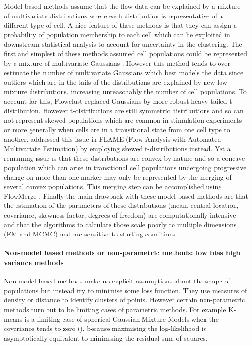 Model based methods assume that the flow data can be explained by a mixture of multivariate distributions where each distribution is representative of a different type of cell.
A nice feature of these methods is that they can assign a probability of population membership to each cell which can be exploited in downstream statistical analysis to account for uncertainty in the clustering.
The first and simplest of these methods assumed cell populations could be represented by a mixture of multivariate Gaussians \citep{Chan:2008gq}.
However this method tends to over estimate the number of multivariate Gaussians which best models the data since outliers which are in the tails of the distributions
are explained by new low mixture distributions, increasing unreasonably the number of cell populations.
To account for this, Flowclust \citep{Lo:2008it} replaced Gaussians by more robust heavy tailed t-distribution.
However t-distributions are still symmetric distributions and so can not represent skewed populations which are common in stimulation experiments or more generally when cells are in a transitional state from one cell type to another.
\citet{Pyne:2009hl} addressed this issue in FLAME (Flow Analysis with Automated Multivariate Estimation) by employing skewed t-distributions instead.
Yet a remaining issue is that these distributions are convex by nature and so a concave population which can arise in transitional cell populations undergoing progressive change on more than one marker may only be represented by the merging of several convex populations.
This merging step can be accomplished using FlowMerge \citep{Finak:2009fk}.
Finally the main drawback with these model-based methods are that the estimation of the parameters of these distributions (mean, central location, covariance, skewness factor, degrees of freedom) are computationally intensive and that the algorithms to calculate those scale poorly to multiple dimensions (EM \citep{Dempster:1977ul} and MCMC) and are sensitive to starting conditions.

\paragraph{Non-model based methods or non-parametric methods: low bias high variance methods}

Non model-based methods make no explicit assumptions about the shape of populations but instead try to minimise some loss function.
They use measures of density or distance to identify clusters of points.
However certain non-parametric methods turn out to be limiting cases of parametric methods.
For example K-means is a limiting case of spherical Gaussian Mixture Models when the covariance tends to zero (),
because maximising the log-likelihood is asymptotically equivalent to minimising the residual sum of squares.

